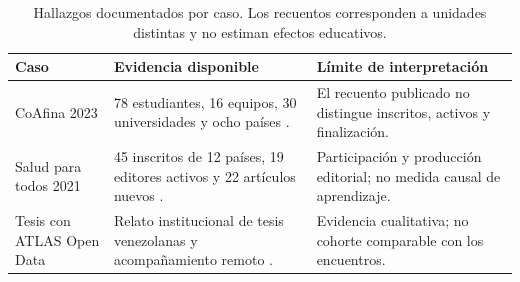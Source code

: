\begin{table}[htbp]\centering\small
\caption{Hallazgos documentados por caso. Los recuentos corresponden a unidades distintas y no estiman efectos educativos.}\label{tab:hallazgos}
\begin{tabularx}{160mm}{@{}p{28mm}XX@{}}\toprule
Caso & Evidencia disponible & Límite de interpretación \\
\midrule
CoAfina 2023 & 78 estudiantes, 16 equipos, 30 universidades y ocho países \cite{coafina}. & El recuento publicado no distingue inscritos, activos y finalización. \\
Salud para todos 2021 & 45 inscritos de 12 países, 19 editores activos y 22 artículos nuevos \cite{salud}. & Participación y producción editorial; no medida causal de aprendizaje. \\
Tesis con ATLAS Open Data & Relato institucional de tesis venezolanas y acompañamiento remoto \cite{atlas}. & Evidencia cualitativa; no cohorte comparable con los encuentros. \\
\bottomrule\end{tabularx}
\end{table}
